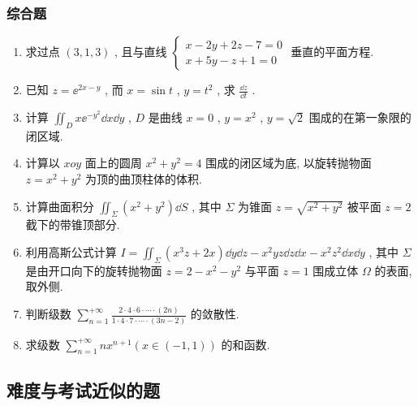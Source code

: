 \subsubsection{综合题}
\begin{enumerate}
	\item 求过点 $(3,1,3)$ , 且与直线 $
	\begin{cases}
		x-2y+2z-7=0\\
		x+5y-z+1=0
	\end{cases}
	$ 垂直的平面方程.

	\item 已知 $z=\ee^{2x-y}$ , 而 $x=\sin t$ , $y=t^2$ , 求 $\frac{\dd z}{\dd t}$ .
	
	\item 计算 $\iint_{D} x\ee^{-y^2}\dd x\dd y$ , $D$ 是曲线 $x=0$ , $y=x^2$ , $y=\sqrt{2}$ 围成的在第一象限的闭区域.
	
	\item 计算以 $xoy$ 面上的圆周 $x^2+y^2=4$ 围成的闭区域为底, 以旋转抛物面 $z=x^2+y^2$ 为顶的曲顶柱体的体积.
	
	\item 计算曲面积分 $\iint_{\Sigma}\left( x^2+y^2 \right)\dd S$ , 其中 $\Sigma$ 为锥面 $z=\sqrt{x^2+y^2}$ 被平面 $z=2$ 截下的带锥顶部分.
	
	\item 利用高斯公式计算 $I=\iint_{\Sigma}\left( x^3 z+2x \right)\dd y\dd z-x^2 yz\dd z\dd x-x^2 z^2\dd x\dd y$ , 其中 $\Sigma$ 是由开口向下的旋转抛物面 $z=2-x^2-y^2$ 与平面 $z=1$ 围成立体 $\Omega$ 的表面, 取外侧.
	
	\item 判断级数 $\sum_{n=1}^{+\infty}\frac{2\cdot 4\cdot 6\cdot\cdots\cdot (2n)}{1\cdot 4\cdot 7\cdot\cdots\cdot (3n-2)}$ 的敛散性.
	
	\item 求级数 $\sum_{n=1}^{+\infty}nx^{n+1}(x\in(-1,1))$ 的和函数.
\end{enumerate}





\subsection{难度与考试近似的题}
